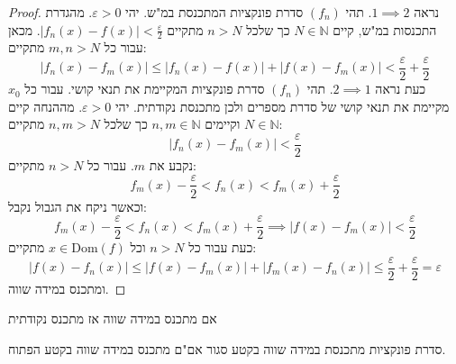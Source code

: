 \documentclass{tstextbook}
\begin{document}
\begin{proof}
נראה \(1\implies 2\). תהי \((f_{n})\) סדרת פונקציות המתכנסת במ"ש. יהי \(\varepsilon>0\). מהגדרת התכנסות במ"ש, קיים \(N \in \mathbb{N}\) כך שלכל \(n > N\) מתקיים \(\lvert f_{n}(x)-f(x) \rvert<\frac{\varepsilon}{2}\). מכאן עבור כל \(m,n>N\) מתקיים:
$$\lvert f_{n}(x)-f_{m}(x) \rvert \leq \lvert f_{n}(x)-f(x) \rvert +\lvert f(x)-f_{m}(x) \rvert <\frac{\varepsilon}{2}+\frac{\varepsilon}{2}$$
כעת נראה \(2\implies 1\). תהי \((f_{n})\) סדרת פונקציות המקיימת את תנאי קושי.  עבור כל \(x_{0}\) מקיימת את תנאי קושי של סדרת מספרים ולכן מתכנסת נקודתית. יהי \(\varepsilon>0\). מההנחה קיים \(N \in \mathbb{N}\) וקיימים \(n,m \in \mathbb{N}\) כך שלכל \(n,m> N\) מתקיים:
$$\lvert f_{n}(x)-f_{m}(x) \rvert <\frac{\varepsilon}{2}$$
נקבע את \(m\). עבור כל \(n>N\) מתקיים:
$$f_{m}(x)-\frac{\varepsilon}{2}<f_{n}(x)<f_{m}(x)+\frac{\varepsilon}{2}$$
וכאשר ניקח את הגבול נקבל:
$$f_{m}(x)-\frac{\varepsilon}{2}<f_{n}(x)<f_{m}(x)+\frac{\varepsilon}{2}\implies \lvert f(x)-f_{m}(x) \rvert <\frac{\varepsilon}{2}$$
כעת עבור כל \(n>N\) וכל \(x \in \mathrm{Dom}(f)\) מתקיים:
$$\lvert f(x)-f_{n}(x) \rvert \leq \lvert f(x)-f_{m}(x) \rvert +\lvert f_{m}(x)-f_{n}(x) \rvert \leq \frac{\varepsilon}{2}+\frac{\varepsilon}{2}=\varepsilon$$
ומתכנס במידה שווה.

\end{proof}
\begin{proposition}
אם מתכנס במידה שווה אז מתכנס נקודתית

\end{proposition}
\begin{proposition}
סדרת פונקציות מתכנסת במידה שווה בקטע סגור אם"ם מתכנס במידה שווה בקטע הפתוח.

\end{proposition}
\end{document}
